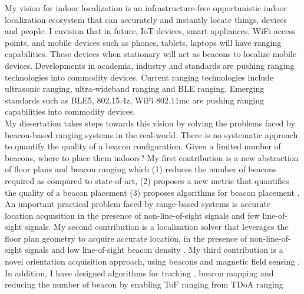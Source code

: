 \documentclass[10pt]{article}
\begin{document}

My vision for indoor localization is  an infrastructure-free opportunistic indoor localization ecosystem that can accurately and instantly locate things, devices and people. I envision that in future, IoT devices, smart appliances, WiFi access points, and mobile devices such as phones, tablets, laptops will have ranging capabilities. These devices when stationary will act as beacons to localize mobile devices. Developments in academia, industry and standards are pushing ranging technologies into commodity devices. Current ranging technologies include ultrasonic ranging, ultra-wideband ranging and BLE ranging. Emerging standards such as BLE5, 802.15.4z, WiFi 802.11mc are pushing ranging capabilities into commodity devices. \\


My dissertation takes steps towards this vision by solving the problems faced by beacon-based ranging systems in the real-world. There is no systematic approach to quantify the quality of a beacon configuration. Given a limited number of beacons, where to place them indoors? My first contribution is a new abstraction of floor plans and beacon ranging which (1) reduces the number of beacons required as compared to state-of-art, (2) proposes a new metric that quantifies the quality of a beacon placement (3) proposes algorithms for beacon placement \cite{rajagopal2016beacon}. An important practical problem faced by range-based systems is accurate location acquisition in the presence of non-line-of-sight signals and few line-of-sight signals. My second contribution is a localization solver that leverages the floor plan geometry to acquire accurate location, in the presence of non-line-of-sight signals and low line-of-sight beacon density \cite{rajagopal2018enhancing}. My third contribution is a novel orientation acquisition approach, using beacons and magnetic field sensing \cite{mobileAR}. In addition, I have designed algorithms for tracking \cite{lazik2015alps}, beacon mapping \cite{lazik2015alps,mobileAR} and reducing the number of beacon by enabling ToF ranging from TDoA ranging \cite{rtas-alps-platform}\\
\end{document}
